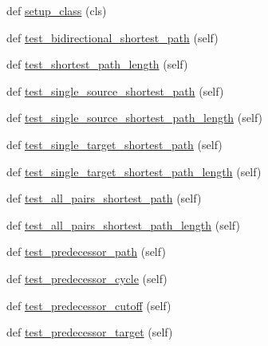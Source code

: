 \begin{DoxyCompactItemize}
\item 
def \hyperlink{classnetworkx_1_1algorithms_1_1shortest__paths_1_1tests_1_1test__unweighted_1_1TestUnweightedPath_a31058f3c0ca3ebd1b9273450600bb8bb}{setup\+\_\+class} (cls)
\item 
def \hyperlink{classnetworkx_1_1algorithms_1_1shortest__paths_1_1tests_1_1test__unweighted_1_1TestUnweightedPath_aaeb48638cdd31ba1c25d5f46395b4520}{test\+\_\+bidirectional\+\_\+shortest\+\_\+path} (self)
\item 
def \hyperlink{classnetworkx_1_1algorithms_1_1shortest__paths_1_1tests_1_1test__unweighted_1_1TestUnweightedPath_af048b38e1dfefd2eed46238e19cfe284}{test\+\_\+shortest\+\_\+path\+\_\+length} (self)
\item 
def \hyperlink{classnetworkx_1_1algorithms_1_1shortest__paths_1_1tests_1_1test__unweighted_1_1TestUnweightedPath_a565b046c39b30471cb6d257c9b834736}{test\+\_\+single\+\_\+source\+\_\+shortest\+\_\+path} (self)
\item 
def \hyperlink{classnetworkx_1_1algorithms_1_1shortest__paths_1_1tests_1_1test__unweighted_1_1TestUnweightedPath_a049f678e0c8acb09cbb37077b45b2659}{test\+\_\+single\+\_\+source\+\_\+shortest\+\_\+path\+\_\+length} (self)
\item 
def \hyperlink{classnetworkx_1_1algorithms_1_1shortest__paths_1_1tests_1_1test__unweighted_1_1TestUnweightedPath_a88d2d1ef8b336a446fff4497bc6eaf5a}{test\+\_\+single\+\_\+target\+\_\+shortest\+\_\+path} (self)
\item 
def \hyperlink{classnetworkx_1_1algorithms_1_1shortest__paths_1_1tests_1_1test__unweighted_1_1TestUnweightedPath_a56d250dd0089544c8a0cac681b5b88fc}{test\+\_\+single\+\_\+target\+\_\+shortest\+\_\+path\+\_\+length} (self)
\item 
def \hyperlink{classnetworkx_1_1algorithms_1_1shortest__paths_1_1tests_1_1test__unweighted_1_1TestUnweightedPath_a6e084decb03ca57ce94b21d81e850263}{test\+\_\+all\+\_\+pairs\+\_\+shortest\+\_\+path} (self)
\item 
def \hyperlink{classnetworkx_1_1algorithms_1_1shortest__paths_1_1tests_1_1test__unweighted_1_1TestUnweightedPath_a7c2b73ac4b79b585cfe5bd4574eae3f5}{test\+\_\+all\+\_\+pairs\+\_\+shortest\+\_\+path\+\_\+length} (self)
\item 
def \hyperlink{classnetworkx_1_1algorithms_1_1shortest__paths_1_1tests_1_1test__unweighted_1_1TestUnweightedPath_a1c6df42a1908860d7369f1653245aa5a}{test\+\_\+predecessor\+\_\+path} (self)
\item 
def \hyperlink{classnetworkx_1_1algorithms_1_1shortest__paths_1_1tests_1_1test__unweighted_1_1TestUnweightedPath_a26a9576dae17da8abeaead94ca091d0b}{test\+\_\+predecessor\+\_\+cycle} (self)
\item 
def \hyperlink{classnetworkx_1_1algorithms_1_1shortest__paths_1_1tests_1_1test__unweighted_1_1TestUnweightedPath_a6f166ed2145ee2c9b21e73bdbaec3b29}{test\+\_\+predecessor\+\_\+cutoff} (self)
\item 
def \hyperlink{classnetworkx_1_1algorithms_1_1shortest__paths_1_1tests_1_1test__unweighted_1_1TestUnweightedPath_acfbae7a53a14d83eebeaa2b9d5ba9fe0}{test\+\_\+predecessor\+\_\+target} (self)
\end{DoxyCompactItemize}
